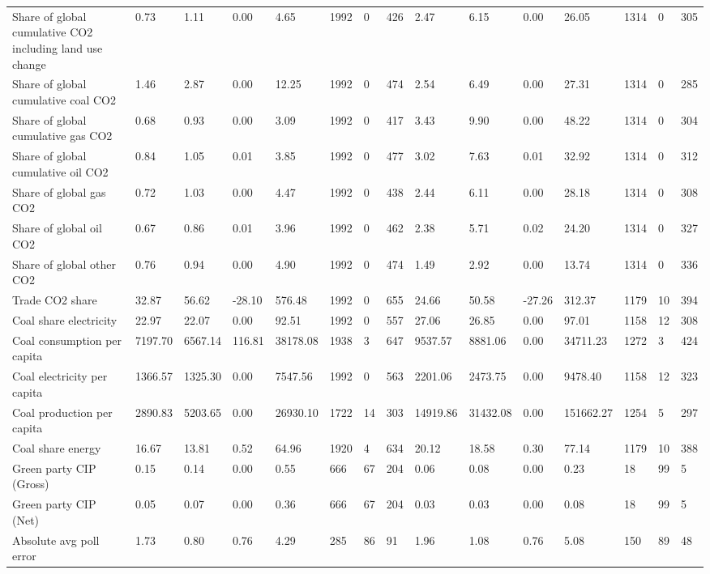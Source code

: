 \begin{longtable}{lllllllllllllll}
Share of global cumulative CO2 including land use change & 0.73 & 1.11 & 0.00 & 4.65 & 1992 & 0 & 426 & 2.47 & 6.15 & 0.00 & 26.05 & 1314 & 0 & 305\\
Share of global cumulative coal CO2 & 1.46 & 2.87 & 0.00 & 12.25 & 1992 & 0 & 474 & 2.54 & 6.49 & 0.00 & 27.31 & 1314 & 0 & 285\\
Share of global cumulative gas CO2 & 0.68 & 0.93 & 0.00 & 3.09 & 1992 & 0 & 417 & 3.43 & 9.90 & 0.00 & 48.22 & 1314 & 0 & 304\\
Share of global cumulative oil CO2 & 0.84 & 1.05 & 0.01 & 3.85 & 1992 & 0 & 477 & 3.02 & 7.63 & 0.01 & 32.92 & 1314 & 0 & 312\\
\addlinespace
Share of global gas CO2 & 0.72 & 1.03 & 0.00 & 4.47 & 1992 & 0 & 438 & 2.44 & 6.11 & 0.00 & 28.18 & 1314 & 0 & 308\\
Share of global oil CO2 & 0.67 & 0.86 & 0.01 & 3.96 & 1992 & 0 & 462 & 2.38 & 5.71 & 0.02 & 24.20 & 1314 & 0 & 327\\
Share of global other CO2 & 0.76 & 0.94 & 0.00 & 4.90 & 1992 & 0 & 474 & 1.49 & 2.92 & 0.00 & 13.74 & 1314 & 0 & 336\\
Trade CO2 share & 32.87 & 56.62 & -28.10 & 576.48 & 1992 & 0 & 655 & 24.66 & 50.58 & -27.26 & 312.37 & 1179 & 10 & 394\\
Coal share electricity & 22.97 & 22.07 & 0.00 & 92.51 & 1992 & 0 & 557 & 27.06 & 26.85 & 0.00 & 97.01 & 1158 & 12 & 308\\
\addlinespace
Coal consumption per capita & 7197.70 & 6567.14 & 116.81 & 38178.08 & 1938 & 3 & 647 & 9537.57 & 8881.06 & 0.00 & 34711.23 & 1272 & 3 & 424\\
Coal electricity per capita & 1366.57 & 1325.30 & 0.00 & 7547.56 & 1992 & 0 & 563 & 2201.06 & 2473.75 & 0.00 & 9478.40 & 1158 & 12 & 323\\
Coal production per capita & 2890.83 & 5203.65 & 0.00 & 26930.10 & 1722 & 14 & 303 & 14919.86 & 31432.08 & 0.00 & 151662.27 & 1254 & 5 & 297\\
Coal share energy & 16.67 & 13.81 & 0.52 & 64.96 & 1920 & 4 & 634 & 20.12 & 18.58 & 0.30 & 77.14 & 1179 & 10 & 388\\
Green party CIP (Gross) & 0.15 & 0.14 & 0.00 & 0.55 & 666 & 67 & 204 & 0.06 & 0.08 & 0.00 & 0.23 & 18 & 99 & 5\\
\addlinespace
Green party CIP (Net) & 0.05 & 0.07 & 0.00 & 0.36 & 666 & 67 & 204 & 0.03 & 0.03 & 0.00 & 0.08 & 18 & 99 & 5\\
Absolute avg poll error & 1.73 & 0.80 & 0.76 & 4.29 & 285 & 86 & 91 & 1.96 & 1.08 & 0.76 & 5.08 & 150 & 89 & 48\\

\end{longtable}

